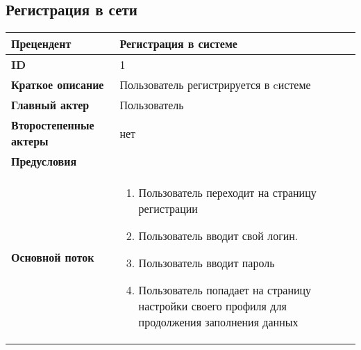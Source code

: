 \documentclass{article}
\begin{document}
\subsection{Регистрация в сети}
\begin{center}
  \begin{tabular}{|l|p{9cm}|}
  \hline
  \textbf{Прецендент} & Регистрация в системе \\
  \hline
  \textbf{ID} & 1 \\
  \hline
  \textbf{Краткое описание} & Пользователь регистрируется в cистеме \\
  \hline
  \textbf{Главный актер} & Пользователь\\
  \hline
  \textbf{Второстепенные актеры} & нет \\
  \hline
  \textbf{Предусловия} &  \\
  \hline
  \textbf{Основной поток} & \begin{enumerate}
    \item Пользователь переходит на страницу регистрации
    \item Пользователь вводит свой логин.
    \item Пользователь вводит пароль
    \item Пользователь попадает на страницу настройки своего профиля для продолжения заполнения данных
  \end{enumerate} \\
  \hline
\end{tabular}


\end{center}



\printnoidxglossaries
\end{document}
